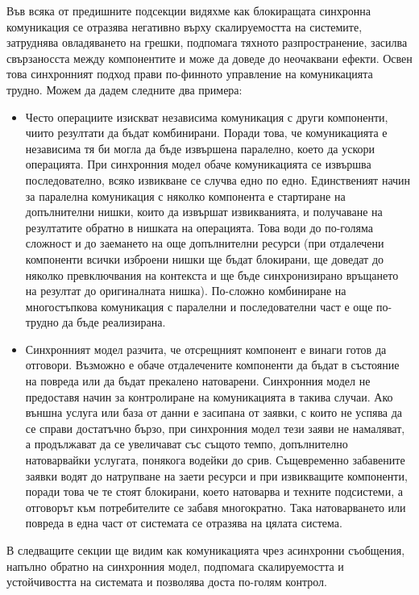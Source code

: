 Във всяка от предишните подсекции видяхме как блокиращата синхронна комуникация се отразява негативно върху скалируемостта на системите, затруднява овладяването на грешки, подпомага тяхното разпространение, засилва свързаносста между компонентите и може да доведе до неочаквани ефекти. Освен това синхронният подход прави по-финното управление на комуникацията трудно. Можем да дадем следните два примера:

\begin{itemize}
  \item Често операциите изискват независима комуникация с други компоненти, чиито резултати да бъдат комбинирани. Поради това, че комуникацията е независима тя би могла да бъде извършена паралелно, което да ускори операцията. При синхронния модел обаче комуникацията се извършва последователно, всяко извикване се случва едно по едно. Единственият начин за паралелна комуникация с няколко компонента е стартиране на допълнителни нишки, които да извършат извикванията, и получаване на резултатите обратно в нишката на операцията. Това води до по-голяма сложност и до заемането на още допълнителни ресурси (при отдалечени компоненти всички изброени нишки ще бъдат блокирани, ще доведат до няколко превключвания на контекста и ще бъде синхронизирано връщането на резултат до оригиналната нишка). По-сложно комбиниране на многостъпкова комуникация с паралелни и последователни част е още по-трудно да бъде реализирана.
  
  \item Синхронният модел разчита, че отсрещният компонент е винаги готов да отговори. Възможно е обаче отдалечените компоненти да бъдат в състояние на повреда или да бъдат прекалено натоварени. Синхронния модел не предоставя начин за контролиране на комуникацията в такива случаи. Ако външна услуга или база от данни е засипана от заявки, с които не успява да се справи достатъчно бързо, при синхронния модел тези заяви не намаляват, а продължават да се увеличават със същото темпо, допълнително натоварвайки услугата, понякога водейки до срив. Същевременно забавените заявки водят до натрупване на заети ресурси и при извикващите компоненти, поради това че те стоят блокирани, което натоварва и техните подсистеми, а отговорът към потребителите се забавя многократно. Така натоварването или повреда в една част от системата се отразява на цялата система.
\end{itemize}

В следващите секции ще видим как комуникацията чрез асинхронни съобщения, напълно обратно на синхронния модел, подпомага скалируемостта и устойчивостта на системата и позволява доста по-голям контрол.

